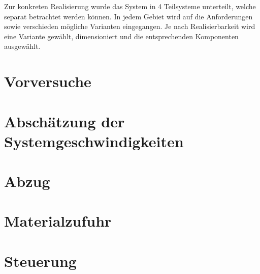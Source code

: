 Zur konkreten Realisierung wurde das System in 4 Teilsysteme unterteilt, welche separat betrachtet werden können. In jedem Gebiet wird auf die Anforderungen sowie verschieden mögliche Varianten eingegangen. Je nach Realisierbarkeit wird eine Variante gewählt, dimensioniert und die entsprechenden Komponenten ausgewählt.

\section{Vorversuche}


\newpage
\section{Abschätzung der Systemgeschwindigkeiten}\label{ch:systemspeed}


\section{Abzug}


\section{Materialzufuhr}




\section{Steuerung}

